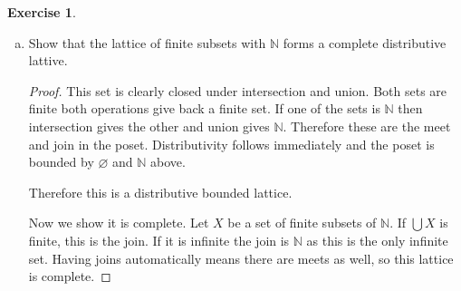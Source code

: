 \documentclass{article}
\newcommand{\N}{\mathbb{N}}
\newcommand{\set}[1]{\left\{#1\right\}}
\newcommand{\setwith}[2]{\set{#1:#2}}
\theoremstyle{definition}
\newtheorem{question}{Exercise}
\begin{document}
\begin{question}
\begin{enumerate}[a)]
\begin{proof}
                  To see the lattice is not complete consider the set
                  \[
                      \setwith{\setwith{2m}{m\in \N,m\leq n}}{n\in\N}
                  \]
                  of elements of the lattice. This set does not have a join:
                  because the union of these sets is infinite, the meet must be
                  cofinite and therefore contain infinitely many odd numbers as
                  well. However, for any such set we can always remove one more
                  odd number to get a smaller upper bound. Therefore there is no
                  least upper bound and the algebra is not complete.
              \end{proof}

        \item Show that the lattice of finite subsets with \(\N\) forms a
              complete distributive lattive.

              \begin{proof}
                  This set is clearly closed under intersection and union. Both
                  sets are finite both operations give back a finite set. If one
                  of the sets is \(\N\) then intersection gives the other and
                  union gives \(\N\). Therefore these are the meet and join in
                  the poset. Distributivity follows immediately and the poset is
                  bounded by \(\varnothing\) and \(\N\) above.

                  Therefore this is a distributive bounded lattice.

                  Now we show it is complete. Let \(X\) be a set of finite
                  subsets of \(\N\). If \(\bigcup X\) is finite, this is the
                  join. If it is infinite the join is \(\N\) as this is the only
                  infinite set. Having joins automatically means there are meets
                  as well, so this lattice is complete.
              \end{proof}
    \end{enumerate}
\end{question}
\end{document}
